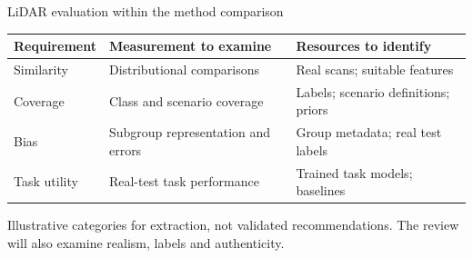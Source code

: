 \begin{frame}{LiDAR evaluation within the method comparison}
\small
\renewcommand{\arraystretch}{1.5}
\begin{tabular}{@{}>{\raggedright\arraybackslash}p{}>{\raggedright\arraybackslash}p{}>{\raggedright\arraybackslash}p{}@{}}
\toprule
\textbf{Requirement} & \textbf{Measurement to examine} & \textbf{Resources to identify}\\
\midrule
Similarity & Distributional comparisons & Real scans; suitable features\\
Coverage & Class and scenario coverage & Labels; scenario definitions; priors\\
Bias & Subgroup representation and errors & Group metadata; real test labels\\
Task utility & Real-test task performance & Trained task models; baselines\\
\bottomrule
\end{tabular}
\vspace{3mm}

{\footnotesize Illustrative categories for extraction, not validated recommendations.
The review will also examine realism, labels and authenticity.}
\end{frame}
